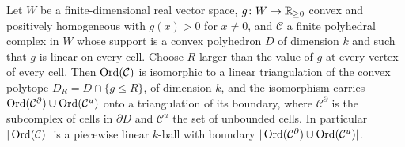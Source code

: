 \begin{lemma}[truncation]\label{lem:trunc}
Let $W$ be a finite-dimensional real vector space, $g\colon W\to\mathbb R_{\ge0}$ convex and positively homogeneous with $g(x)>0$
for $x\ne0$, and $\mathcal C$ a finite polyhedral complex in $W$ whose support is a convex polyhedron $D$ of dimension $k$
and such that $g$ is linear on every cell. Choose $R$ larger than the value of $g$ at every vertex of every cell. Then
$\operatorname{Ord}(\mathcal C)$ is isomorphic to a linear triangulation of the convex polytope $D_R=D\cap\{g\le R\}$, of dimension
$k$, and the isomorphism carries $\operatorname{Ord}(\mathcal C^\partial)\cup\operatorname{Ord}(\mathcal C^u)$ onto a triangulation of its boundary,
where $\mathcal C^\partial$ is the subcomplex of cells in $\partial D$ and $\mathcal C^u$ the set of unbounded cells. In
particular $|\operatorname{Ord}(\mathcal C)|$ is a piecewise linear $k$-ball with boundary $|\operatorname{Ord}(\mathcal C^\partial)\cup
\operatorname{Ord}(\mathcal C^u)|$.
\end{lemma}
